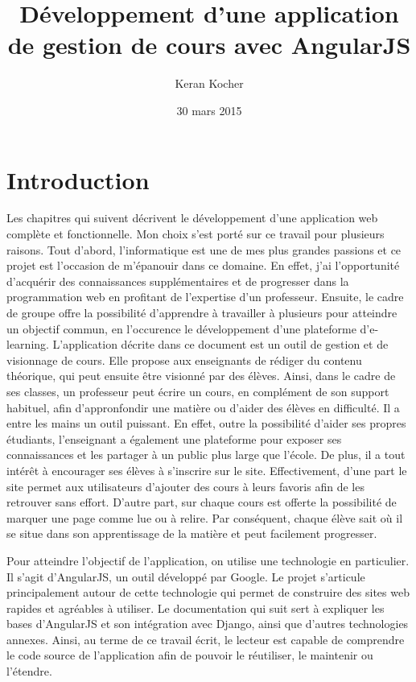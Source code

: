 \documentclass[a4paper,10pt,twoside]{sphinxmanual}
\title{Développement d'une application de gestion de cours avec AngularJS}
\date{30 mars 2015}
\author{Keran Kocher}
\begin{document}
\maketitle
\tableofcontents
{}\label{index::doc}



\chapter{Introduction}
\label{introduction:developpement-d-une-application-de-gestions-de-cours-avec-angularjs}\label{introduction::doc}\label{introduction:introduction}\setcounter{page}{3}
Les chapitres qui suivent décrivent le développement d'une application web complète et fonctionnelle. Mon choix s'est porté sur ce travail pour plusieurs raisons. Tout d'abord, l'informatique est une de mes plus grandes passions et ce projet est l'occasion de m'épanouir dans ce domaine. En effet, j'ai l'opportunité d'acquérir des connaissances supplémentaires et de progresser dans la programmation web en profitant de l'expertise d'un professeur. Ensuite, le cadre de groupe offre la possibilité d'apprendre à travailler à plusieurs pour atteindre un objectif commun, en l'occurence le développement d'une plateforme d'e-learning. L'application décrite dans ce document est un outil de gestion et de visionnage de cours. Elle propose aux enseignants de rédiger du contenu théorique, qui peut ensuite être visionné par des élèves. Ainsi, dans le cadre de ses classes, un professeur peut écrire un cours, en complément de son support habituel, afin d'appronfondir une matière ou d'aider des élèves en difficulté. Il a entre les mains un outil puissant. En effet, outre la possibilité d'aider ses propres étudiants, l'enseignant a également une plateforme pour exposer ses connaissances et les partager à un public plus large que l'école. De plus, il a tout intérêt à encourager ses élèves à s'inscrire sur le site. Effectivement, d'une part le site permet aux utilisateurs d'ajouter des cours à leurs favoris afin de les retrouver sans effort. D'autre part, sur chaque cours est offerte la possibilité de marquer une page comme lue ou à relire. Par conséquent, chaque élève sait où il se situe dans son apprentissage de la matière et peut facilement progresser.

Pour atteindre l'objectif de l'application, on utilise une technologie en particulier. Il s'agit d'AngularJS, un outil développé par Google. Le projet s'articule principalement autour de cette technologie qui permet de construire des sites web rapides et agréables à utiliser. Le documentation qui suit sert à expliquer les bases d'AngularJS et son intégration avec Django, ainsi que d'autres technologies annexes. Ainsi, au terme de ce travail écrit, le lecteur est capable de comprendre le code source de l'application afin de pouvoir le réutiliser, le maintenir ou l'étendre.
\end{document}
